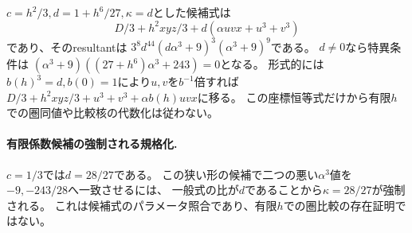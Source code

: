 \begin{corollary}
$c=h^2/3,d=1+h^6/27,\kappa=d$とした候補式は
\[
 D/3+h^2xyz/3+d(\alpha uvx+u^3+v^3)
\]
であり、そのresultantは
$3^8d^{44}(d\alpha^3+9)^3(\alpha^3+9)^9$である。
$d\ne0$なら特異条件は
$(\alpha^3+9)((27+h^6)\alpha^3+243)=0$となる。
形式的には$b(h)^3=d,b(0)=1$により$u,v$を$b^{-1}$倍すれば
$D/3+h^2xyz/3+u^3+v^3+\alpha b(h)uvx$に移る。
この座標恒等式だけから有限$h$での圏同値や比較核の代数化は従わない。
\end{corollary}

\paragraph{有限係数候補の強制される規格化.}
$c=1/3$では$d=28/27$である。
この狭い形の候補で二つの悪い$\alpha^3$値を$-9,-243/28$へ一致させるには、
一般式の比が$d$であることから$\kappa=28/27$が強制される。
これは候補式のパラメータ照合であり、有限$h$での圏比較の存在証明ではない。

